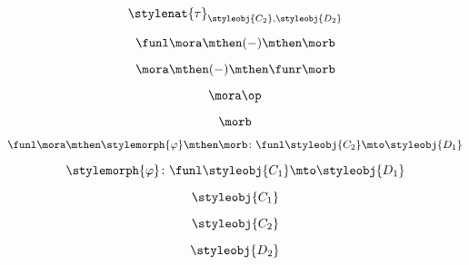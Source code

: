 {\begin{forslides}
        \begin{equation}
            \label{eq:slides_adjunctions_67}
            \stylenat{\tau}_{\styleobj{C_2},\styleobj{D_2}}
        \end{equation}

        \begin{equation}
            \label{eq:slides_adjunctions_68}
            \funl \mora \mthen ( - ) \mthen \morb
        \end{equation}

        \begin{equation}
            \label{eq:slides_adjunctions_69}
            \mora \mthen ( - ) \mthen \funr \morb
        \end{equation}

        \begin{equation}
            \label{eq:slides_adjunctions_70}
            \mora \op
        \end{equation}

        \begin{equation}
            \label{eq:slides_adjunctions_71}
            \morb
        \end{equation}

        \begin{equation}
            \label{eq:slides_adjunctions_72}
            \funl \mora \mthen \stylemorph{\varphi} \mthen \morb \colon \funl \styleobj{C_2} \mto \styleobj{D_1}
        \end{equation}

        \begin{equation}
            \label{eq:slides_adjunctions_73}
            \stylemorph{\varphi} \colon \funl \styleobj{C_1} \mto \styleobj{D_1}
        \end{equation}

        \begin{equation}
            \label{eq:slides_adjunctions_74}
            \styleobj{C_1}
        \end{equation}

        \begin{equation}
            \label{eq:slides_adjunctions_75}
            \styleobj{C_2}
        \end{equation}

        \begin{equation}
            \label{eq:slides_adjunctions_76}
            \styleobj{D_2}
        \end{equation}


\end{forslides}}

